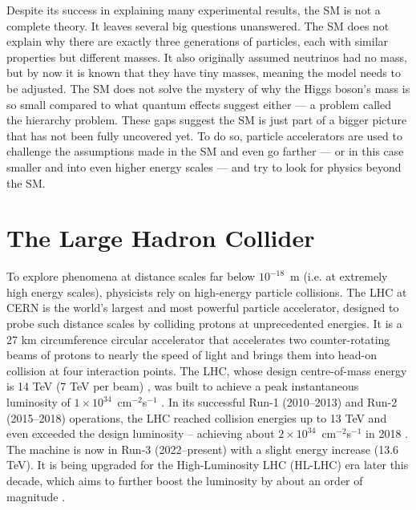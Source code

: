 Despite its success in explaining many experimental results, the SM is not a complete theory. It leaves several big questions unanswered. The SM does not explain why there are exactly three generations of particles, each with similar properties but different masses. It also originally assumed neutrinos had no mass, but by now it is known that they have tiny masses, meaning the model needs to be adjusted.
The SM does not solve the mystery of why the Higgs boson’s mass is so small compared to what quantum effects suggest either — a problem called the hierarchy problem. These gaps suggest the SM is just part of a bigger picture that has not been fully uncovered yet. To do so, particle accelerators are used to challenge the assumptions made in the SM and even go farther — or in this case smaller and into even higher energy scales — and try to look for physics beyond the SM.

\section{The Large Hadron Collider}

To explore phenomena at distance scales far below $10^{-18}$ m (i.e. at extremely high energy scales), physicists rely on high-energy particle collisions. The LHC at CERN is the world’s largest and most powerful particle accelerator, designed to probe such distance scales by colliding protons at unprecedented energies. It is a 27 km circumference circular accelerator that accelerates two counter-rotating beams of protons to nearly the speed of light and brings them into head-on collision at four interaction points. The LHC, whose design centre-of-mass energy is 14 TeV (7 TeV per beam) \cite{Evans:2008zzb}, was built to achieve a peak instantaneous luminosity of $1\times10^{34}$ cm$^{-2}$s$^{-1}$ \cite{Evans:2008zzb}. In its successful Run-1 (2010–2013) and Run-2 (2015–2018) operations, the LHC reached collision energies up to 13 TeV and even exceeded the design luminosity – achieving about $2\times10^{34}$ cm$^{-2}$s$^{-1}$ in 2018 \cite{Hayrapetyan_2024}. The machine is now in Run-3 (2022–present) with a slight energy increase (13.6 TeV). It is being upgraded for the High-Luminosity LHC (HL-LHC) era later this decade, which aims to further boost the luminosity by about an order of magnitude \cite{tomei2025cmsupgradeshighluminositylhc}.

